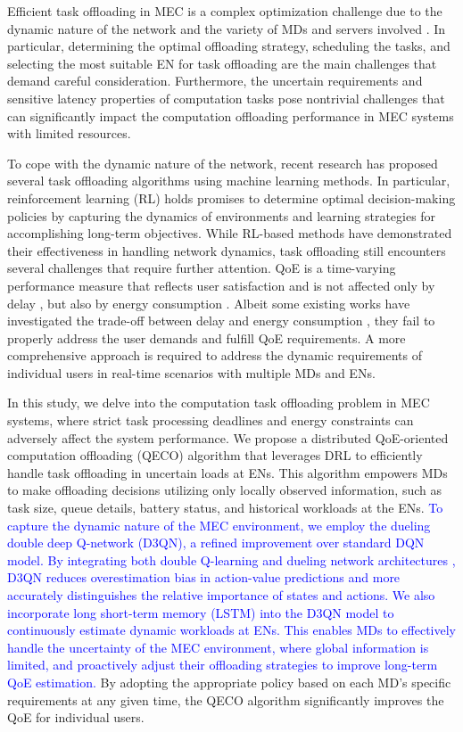 \documentclass[10pt, journal,letterpaper]{IEEEtran}
\begin{document}
Efficient task offloading in MEC is a complex optimization challenge due to the dynamic nature of the network and the variety of MDs and servers involved \cite{jiang2019toward} \cite{TNSE-WU-24}. In particular, determining the optimal offloading strategy, scheduling the tasks, and selecting the most suitable EN for task offloading are the main challenges that demand careful consideration. Furthermore, the uncertain requirements and sensitive latency properties of computation tasks pose nontrivial challenges that can significantly impact the computation offloading performance in MEC systems with limited resources. 


To cope with the dynamic nature of the network, recent research has proposed several task offloading algorithms using machine learning methods. In particular, reinforcement learning (RL) \cite{mnih2015human} holds promises to determine optimal decision-making policies by capturing the dynamics of environments and learning strategies for accomplishing long-term objectives.
While RL-based methods have demonstrated their effectiveness in handling network dynamics, task offloading still encounters several challenges that require further attention. 
QoE is a time-varying performance measure that reflects user satisfaction and is not affected only by delay \cite{guo2022energy}, but also by energy consumption \cite{tang2022uav}. Albeit some existing works have investigated the trade-off between delay and energy consumption \cite{li2022joint}, they fail to properly address the user demands and fulfill QoE requirements. A more comprehensive approach is required to address the dynamic requirements of individual users in real-time scenarios with multiple MDs and ENs.

    	
In this study, we delve into the computation task offloading problem in MEC systems, where strict task processing deadlines and energy constraints can adversely affect the system performance. We propose a distributed QoE-oriented computation offloading (QECO) algorithm that leverages DRL to efficiently handle task offloading in uncertain loads at ENs. This algorithm empowers MDs to make offloading decisions utilizing only locally observed information, such as task size, queue details, battery status, and historical workloads at the ENs. 
  \textcolor{blue}{To capture the dynamic nature of the MEC environment, we employ the dueling double deep Q-network (D3QN), a refined improvement over standard DQN model. By integrating both double Q-learning \cite{van2016deep} and dueling network architectures \cite{wang2016dueling}, D3QN reduces overestimation bias in action-value predictions and more accurately distinguishes the relative importance of states and actions. We also incorporate long short-term memory (LSTM) \cite{hochreiter1997long} into the D3QN model to continuously estimate dynamic workloads at ENs. This enables MDs to effectively handle the uncertainty of the MEC environment, where global information is limited, and proactively adjust their offloading strategies to improve long-term QoE estimation.} By adopting the appropriate policy based on each MD’s specific requirements at any given time, the QECO algorithm significantly improves the QoE for individual users. 
\end{document}
